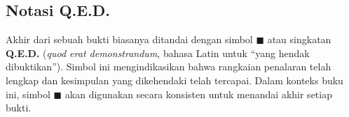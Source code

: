 \subsection{Notasi Q.E.D.}

Akhir dari sebuah bukti biasanya ditandai dengan simbol $\blacksquare$ atau singkatan \textbf{Q.E.D.} (\textit{quod erat demonstrandum}, bahasa Latin untuk ``yang hendak dibuktikan''). Simbol ini mengindikasikan bahwa rangkaian penalaran telah lengkap dan kesimpulan yang dikehendaki telah tercapai. Dalam konteks buku ini, simbol $\blacksquare$ akan digunakan secara konsisten untuk menandai akhir setiap bukti.
